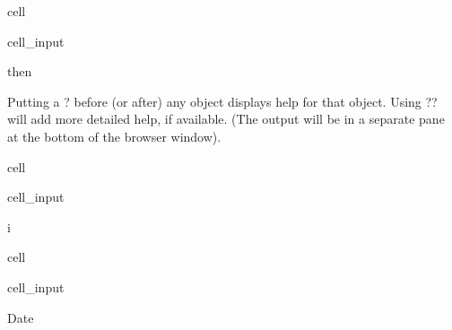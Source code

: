\documentclass[letterpaper,10pt,english]{jupyterBook}
\begin{document}
\begin{sphinxuseclass}{cell}\begin{sphinxVerbatimInput}

\begin{sphinxuseclass}{cell_input}
\begin{sphinxVerbatim}[commandchars=\\\{\}]
 then
\end{sphinxVerbatim}

\end{sphinxuseclass}\end{sphinxVerbatimInput}

\end{sphinxuseclass}
\begin{DUlineblock}{0em}
\item[] 
\end{DUlineblock}

\sphinxAtStartPar
Putting a ? before (or after) any object displays help for that object. Using ?? will add more detailed help, if available. (The output will be in a separate pane at the bottom of the browser window).

\begin{sphinxuseclass}{cell}\begin{sphinxVerbatimInput}

\begin{sphinxuseclass}{cell_input}
\begin{sphinxVerbatim}[commandchars=\\\{\}]
i
\end{sphinxVerbatim}

\end{sphinxuseclass}\end{sphinxVerbatimInput}

\end{sphinxuseclass}
\begin{sphinxuseclass}{cell}\begin{sphinxVerbatimInput}

\begin{sphinxuseclass}{cell_input}
\begin{sphinxVerbatim}[commandchars=\\\{\}]
Date
\end{sphinxVerbatim}

\end{sphinxuseclass}\end{sphinxVerbatimInput}

\end{sphinxuseclass}
\begin{DUlineblock}{0em}
\item[] 
\end{DUlineblock}
\end{document}
